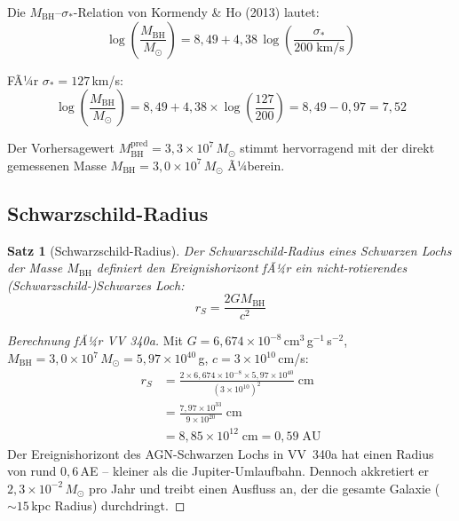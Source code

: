 ﻿\documentclass[12pt,a4paper]{report}
\newtheorem{theorem}{Satz}[chapter]
\begin{document}
Die $M_\mathrm{BH}$--$\sigma_*$-Relation von Kormendy \& Ho (2013) lautet:
\begin{equation}
	\log\left(\frac{M_\mathrm{BH}}{M_\odot}\right) = 8{,}49 + 4{,}38\,\log\left(\frac{\sigma_*}{200\;\text{km/s}}\right)
\end{equation}

FÃ¼r $\sigma_* = 127$\,km/s:
\begin{equation}
	\log\left(\frac{M_\mathrm{BH}}{M_\odot}\right) = 8{,}49 + 4{,}38 \times \log\left(\frac{127}{200}\right) = 8{,}49 - 0{,}97 = 7{,}52
\end{equation}

Der Vorhersagewert $M_\mathrm{BH}^\mathrm{pred} = 3{,}3 \times 10^7\,M_\odot$ stimmt hervorragend mit der direkt gemessenen Masse $M_\mathrm{BH} = 3{,}0 \times 10^7\,M_\odot$ Ã¼berein.

\subsection{Schwarzschild-Radius}

\begin{theorem}[Schwarzschild-Radius]
	Der Schwarzschild-Radius eines Schwarzen Lochs der Masse $M_\mathrm{BH}$ definiert den Ereignishorizont fÃ¼r ein nicht-rotierendes (Schwarzschild-)Schwarzes Loch:
	\begin{equation}
		r_S = \frac{2 G M_\mathrm{BH}}{c^2}
	\end{equation}
\end{theorem}

\begin{proof}[Berechnung fÃ¼r VV 340a]
	Mit $G = 6{,}674 \times 10^{-8}$\,cm$^3$\,g$^{-1}$\,s$^{-2}$, $M_\mathrm{BH} = 3{,}0 \times 10^7\,M_\odot = 5{,}97 \times 10^{40}$\,g, $c = 3 \times 10^{10}$\,cm/s:
	\begin{align}
		r_S &= \frac{2 \times 6{,}674 \times 10^{-8} \times 5{,}97 \times 10^{40}}{(3 \times 10^{10})^2}\;\text{cm} \\
		&= \frac{7{,}97 \times 10^{33}}{9 \times 10^{20}}\;\text{cm} \\
		&= 8{,}85 \times 10^{12}\;\text{cm} = 0{,}59\;\text{AU}
	\end{align}
	Der Ereignishorizont des AGN-Schwarzen Lochs in VV~340a hat einen Radius von rund $0{,}6$\,AE -- kleiner als die Jupiter-Umlaufbahn. Dennoch akkretiert er $2{,}3 \times 10^{-2}\,M_\odot$ pro Jahr und treibt einen Ausfluss an, der die gesamte Galaxie ($\sim 15$\,kpc Radius) durchdringt.
\end{proof}
\end{document}
